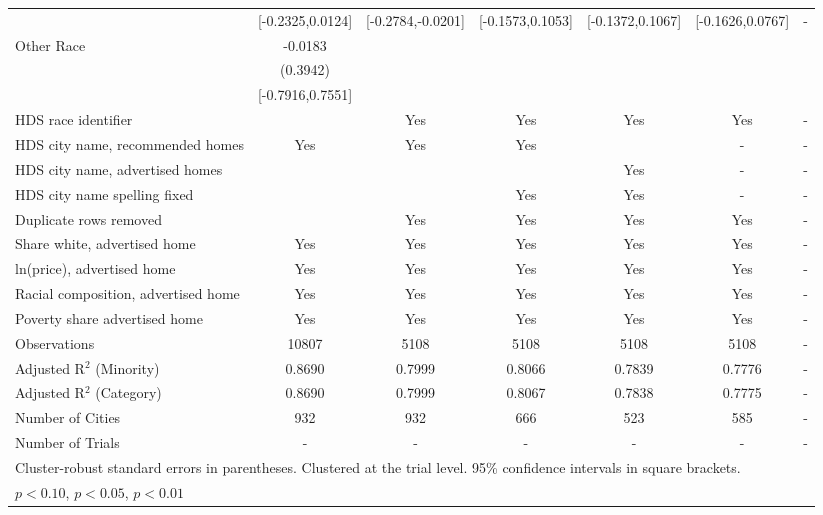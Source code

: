 \begin{table}[htbp]
{\begin{tabular}{l*{6}{c}}
 & [-0.2325,0.0124] & [-0.2784,-0.0201] & [-0.1573,0.1053] & [-0.1372,0.1067] & [-0.1626,0.0767] & - \\
Other Race & -0.0183 &  &  &  &  &  \\
 & (0.3942) &  &  &  &  &  \\
 & [-0.7916,0.7551] &  &  &  &  &  \\
\midrule
HDS race identifier & & Yes & Yes & Yes & Yes & - \\
HDS city name, recommended homes & Yes & Yes & Yes & & - & -\\
HDS city name, advertised homes &  &  &  & Yes & - & -\\
HDS city name spelling fixed & & & Yes & Yes & - & -\\
Duplicate rows removed &  & Yes & Yes & Yes & Yes & - \\
\midrule
Share white, advertised home  & Yes & Yes & Yes & Yes & Yes & - \\
ln(price), advertised home  & Yes & Yes & Yes & Yes & Yes & - \\
Racial composition, advertised home & Yes & Yes & Yes & Yes & Yes & - \\
Poverty share advertised home & Yes & Yes & Yes & Yes & Yes & - \\
Observations & 10807 & 5108 & 5108 & 5108 & 5108 & - \\
Adjusted R$^2$ (Minority) & 0.8690 & 0.7999 & 0.8066 & 0.7839 & 0.7776 & - \\
Adjusted R$^2$ (Category) & 0.8690 & 0.7999 & 0.8067 & 0.7838 & 0.7775 & - \\
Number of Cities & 932 & 932 & 666 & 523 & 585 & - \\
Number of Trials & - & - & - & - & - & - \\
\bottomrule
\multicolumn{7}{l}{\footnotesize Cluster-robust standard errors in parentheses. Clustered at the trial level. 95\% confidence intervals in square brackets.}\\
\multicolumn{7}{l}{\footnotesize \sym{*} \(p<0.10\), \sym{**} \(p<0.05\), \sym{***} \(p<0.01\)}\\
\end{tabular}
}
\end{table}
